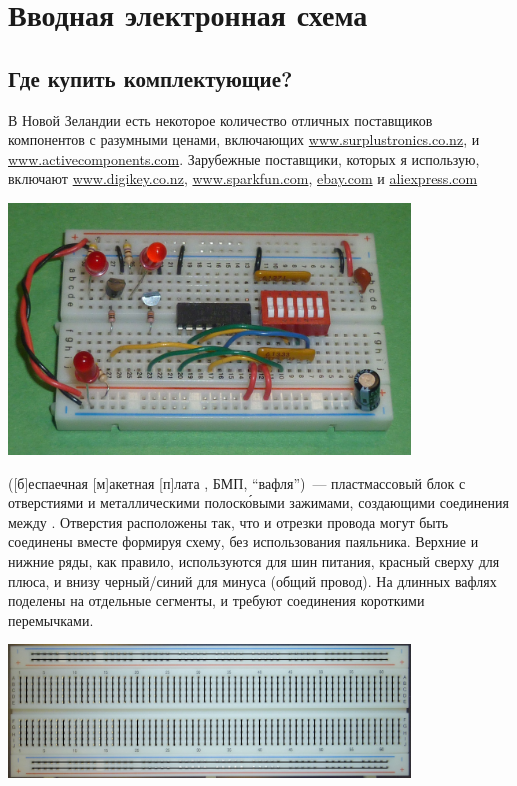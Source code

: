 
\chapter{Вводная электронная схема}

\section{Где купить комплектующие?}

В Новой Зеландии есть некоторое количество отличных поставщиков компонентов с
разумными ценами, включающих \url{www.surplustronics.co.nz}, и
\url{www.activecomponents.com}. Зарубежные поставщики, которых я использую,
включают \url{www.digikey.co.nz}, \url{www.sparkfun.com}, \url{ebay.com}
и \url{aliexpress.com}

\bigskip
\includegraphics[width=0.8\textwidth]{bcollis/breadboard2.jpg}

 ([б]еспаечная [м]акетная [п]лата , БМП, ``вафля'')\ ---
пластмассовый блок с отверстиями и металлическими полоск\'{о}выми зажимами,
создающими соединения между . Отверстия расположены так,
что  и отрезки провода могут быть соединены вместе формируя
схему, без использования паяльника. Верхние и нижние ряды, как правило,
используются для шин питания, красный сверху для плюса, и внизу черный/синий для
минуса (общий провод). На длинных вафлях  поделены на
отдельные сегменты, и требуют соединения короткими перемычками.

\includegraphics[width=0.8\textwidth]{bcollis/BreadboardConnections.jpg}


